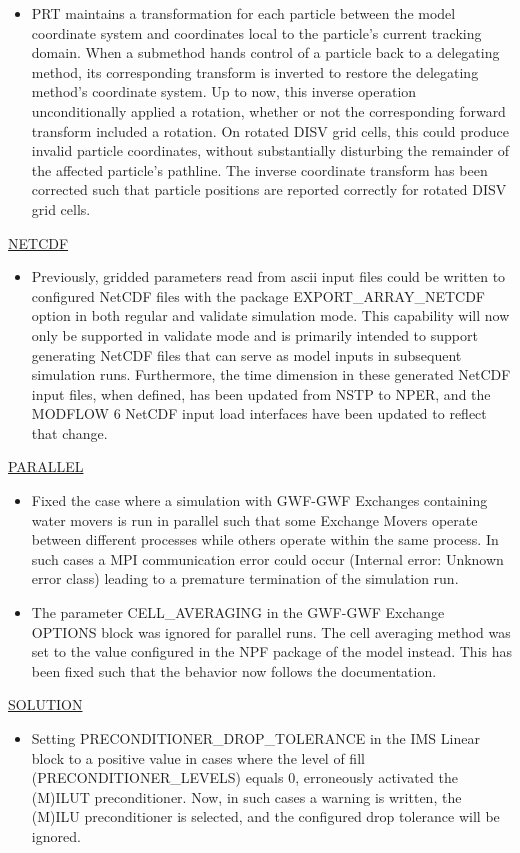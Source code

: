 \begin{itemize}
\item PRT maintains a transformation for each particle between the model coordinate system and coordinates local to the particle's current tracking domain. When a submethod hands control of a particle back to a delegating method, its corresponding transform is inverted to restore the delegating method's coordinate system. Up to now, this inverse operation unconditionally applied a rotation, whether or not the corresponding forward transform included a rotation. On rotated DISV grid cells, this could produce invalid particle coordinates, without substantially disturbing the remainder of the affected particle's pathline. The inverse coordinate transform has been corrected such that particle positions are reported correctly for rotated DISV grid cells.
\end{itemize}

\underline{NETCDF}
\begin{itemize}
\item Previously, gridded parameters read from ascii input files could be written to configured NetCDF files with the package EXPORT\_ARRAY\_NETCDF option in both regular and validate simulation mode. This capability will now only be supported in validate mode and is primarily intended to support generating NetCDF files that can serve as model inputs in subsequent simulation runs. Furthermore, the time dimension in these generated NetCDF input files, when defined, has been updated from NSTP to NPER, and the MODFLOW 6 NetCDF input load interfaces have been updated to reflect that change.
\end{itemize}

\underline{PARALLEL}
\begin{itemize}
\item Fixed the case where a simulation with GWF-GWF Exchanges containing water movers is run in parallel such that some Exchange Movers operate between different processes while others operate within the same process. In such cases a MPI communication error could occur (Internal error: Unknown error class) leading to a premature termination of the simulation run.
\item The parameter CELL\_AVERAGING in the GWF-GWF Exchange OPTIONS block was ignored for parallel runs. The cell averaging method was set to the value configured in the NPF package of the model instead. This has been fixed such that the behavior now follows the documentation.
\end{itemize}

\underline{SOLUTION}
\begin{itemize}
\item Setting PRECONDITIONER\_DROP\_TOLERANCE in the IMS Linear block to a positive value in cases where the level of fill (PRECONDITIONER\_LEVELS) equals 0, erroneously activated the (M)ILUT preconditioner. Now, in such cases a warning is written, the (M)ILU preconditioner is selected, and the configured drop tolerance will be ignored.
\end{itemize}

